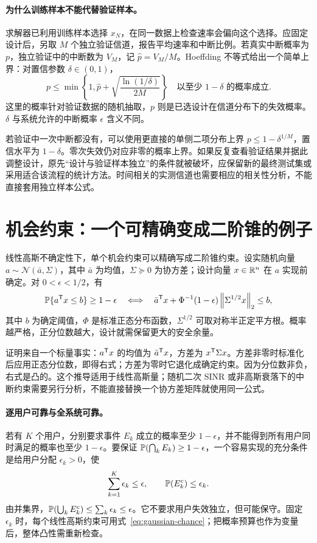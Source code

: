 \paragraph{为什么训练样本不能代替验证样本。}
求解器已利用训练样本选择 $x_N$，在同一数据上检查速率会偏向这个选择。应固定设计后，另取 $M$ 个独立验证信道，报告平均速率和中断比例。若真实中断概率为 $p$，独立验证中的中断数为 $V_M$，记 $\widehat p=V_M/M$。Hoeffding 不等式给出一个简单上界：对置信参数 $\delta\in(0,1)$，
\begin{equation}
 p\le\min\!\left\{1,\widehat p+
 \sqrt{\frac{\ln(1/\delta)}{2M}}\right\}
 \quad\text{以至少 }1-\delta\text{ 的概率成立}.
 \label{eq:validation-bound}
\end{equation}
这里的概率针对验证数据的随机抽取，$p$ 则是已选设计在信道分布下的失效概率。$\delta$ 与系统允许的中断概率 $\epsilon$ 含义不同。

若验证中一次中断都没有，可以使用更直接的单侧二项分布上界 $p\le1-\delta^{1/M}$，置信水平为 $1-\delta$。零次失效仍对应非零的概率上界。如果反复查看验证结果并据此调整设计，原先“设计与验证样本独立”的条件就被破坏，应保留新的最终测试集或采用适合该流程的统计方法。时间相关的实测信道也需要相应的相关性分析，不能直接套用独立样本公式。

\section{机会约束：一个可精确变成二阶锥的例子}
线性高斯不确定性下，单个机会约束可以精确写成二阶锥约束。设实随机向量 $a\sim\mathcal N(\bar a,\Sigma)$，其中 $\bar a$ 为均值，$\Sigma\succeq0$ 为协方差；设计向量 $x\in\mathbb R^n$ 在 $a$ 实现前确定。对 $0<\epsilon<1/2$，有\cite{ben2009}
\begin{equation}
 \mathbb P\{a^\mathsf T x\le b\}\ge1-\epsilon
 \quad\Longleftrightarrow\quad
 \bar a^\mathsf T x+\Phi^{-1}(1-\epsilon)\left\lVert \Sigma^{1/2}x\right\rVert_2\le b,
 \label{eq:gaussian-chance}
\end{equation}
其中 $b$ 为确定阈值，$\Phi$ 是标准正态分布函数，$\Sigma^{1/2}$ 可取对称半正定平方根。概率越严格，正分位数越大，设计就需保留更大的安全余量。

证明来自一个标量事实：$a^\mathsf T x$ 的均值为 $\bar a^\mathsf T x$，方差为 $x^\mathsf T\Sigma x$。方差非零时标准化后应用正态分位数，即得右式；方差为零时它退化成确定约束。因为分位数非负，右式是凸的。这个推导适用于线性高斯量；随机二次 SINR 或非高斯衰落下的中断约束需要另行分析，不能直接替换一个协方差矩阵就使用同一公式。

\paragraph{逐用户可靠与全系统可靠。}
若有 $K$ 个用户，分别要求事件 $E_k$ 成立的概率至少 $1-\epsilon$，并不能得到所有用户同时满足的概率也至少 $1-\epsilon$。要保证
$\mathbb P(\bigcap_k E_k)\ge1-\epsilon$，一个容易实现的充分条件是给用户分配 $\epsilon_k>0$，使
\begin{equation}
 \sum_{k=1}^K\epsilon_k\le\epsilon,\qquad
 \mathbb P(E_k^c)\le\epsilon_k.
\end{equation}
由并集界，$\mathbb P(\bigcup_kE_k^c)\le\sum_k\epsilon_k\le\epsilon$。它不要求用户失效独立，但可能保守。固定 $\epsilon_k$ 时，每个线性高斯约束可用式~\eqref{eq:gaussian-chance}；把概率预算也作为变量后，整体凸性需重新检查。

